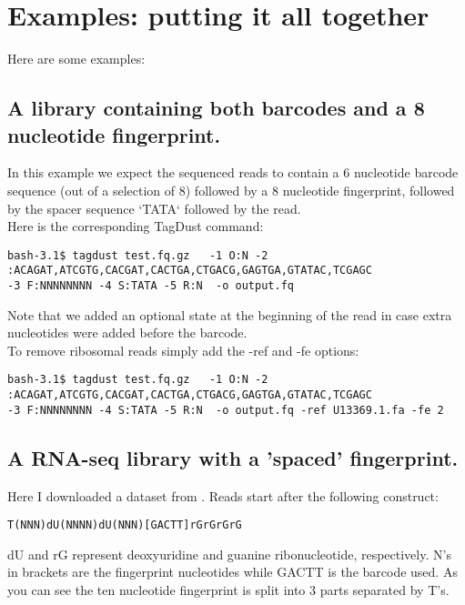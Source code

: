 \documentclass[11pt,a4paper,oneside]{book}
\begin{document}
\chapter{Examples: putting it all together}

Here are some examples: 

\section{A library containing both barcodes and a 8 nucleotide fingerprint.}

In this example we expect the sequenced reads to contain a 6 nucleotide barcode sequence (out of a selection of 8) followed by a 8 nucleotide fingerprint, followed by the spacer sequence `TATA` followed by the read. \\

Here is the corresponding TagDust command: 


{\small
\begin{verbatim}
bash-3.1$ tagdust test.fq.gz   -1 O:N -2 :ACAGAT,ATCGTG,CACGAT,CACTGA,CTGACG,GAGTGA,GTATAC,TCGAGC
-3 F:NNNNNNNN -4 S:TATA -5 R:N  -o output.fq
\end{verbatim}
}

Note that we added an optional state at the beginning of the read in case extra nucleotides were added before the barcode.  \\ 

To remove ribosomal reads simply add the -ref and -fe options:

{\small
\begin{verbatim}
bash-3.1$ tagdust test.fq.gz   -1 O:N -2 :ACAGAT,ATCGTG,CACGAT,CACTGA,CTGACG,GAGTGA,GTATAC,TCGAGC
-3 F:NNNNNNNN -4 S:TATA -5 R:N  -o output.fq -ref U13369.1.fa -fe 2 
\end{verbatim}
}




\section{A RNA-seq library with a 'spaced' fingerprint.}

Here I downloaded a dataset from \cite{Kivioja:2012kg}. Reads start after the following construct:

{
\begin{verbatim}
T(NNN)dU(NNNN)dU(NNN)[GACTT]rGrGrGrG
\end{verbatim}
}
dU and rG represent deoxyuridine and guanine ribonucleotide, respectively. N's in brackets are the fingerprint nucleotides while GACTT is the barcode used. As you can see the ten nucleotide fingerprint is split into 3 parts separated by T's. \\
\end{document}
